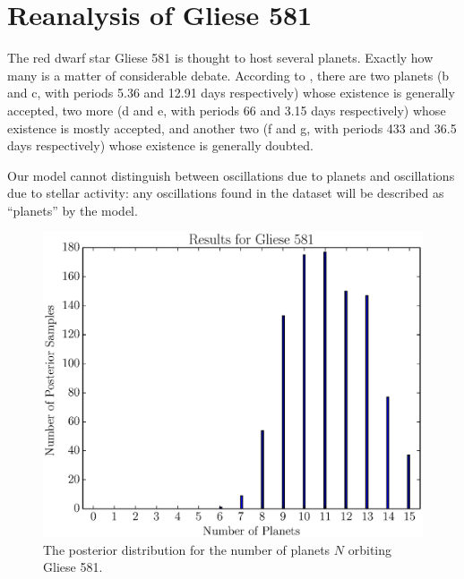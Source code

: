 \documentclass[useAMS,usenatbib]{mn2e}
\begin{document}
\section{Reanalysis of Gliese 581}

The red dwarf star Gliese 581 is thought to host several planets. Exactly
how many is a matter of considerable debate. According to
\citet{2014Sci...345..440R}, there are two planets
(b and c, with periods 5.36 and 12.91 days respectively)
whose existence is generally
accepted, two more
(d and e, with periods 66 and 3.15 days respectively)
whose existence is mostly accepted, and another two
(f and g, with periods 433 and 36.5 days respectively)
whose existence is generally doubted.

Our model cannot distinguish between oscillations due to planets and
oscillations due to stellar activity: any oscillations found in the dataset
will be described as ``planets'' by the model.

\begin{figure}
\includegraphics[scale=0.5]{Figures/gliese581_N.eps}
\caption{The posterior distribution for the number of planets $N$ orbiting
Gliese 581.\label{fig:gliese581_N}}
\end{figure}
\end{document}
